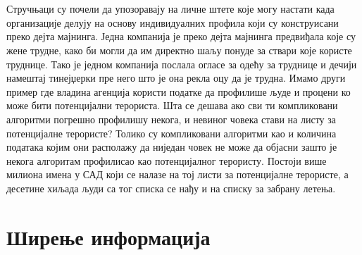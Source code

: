 \documentclass{article}
\begin{document}
\\\\
Стручњаци су почели да упозоравају на личне штете које могу настати када организације делују на основу индивидуалних профила који су конструисани преко дејта мајнинга. Једна компанија је преко дејта мајнинга предвиђала које су жене трудне, како би могли да им директно шаљу понуде за ствари које користе труднице. Тако је једном компанија послала огласе за одећу за труднице и дечији намештај тинејџерки пре него што је она рекла оцу да је трудна.
Имамо други пример где владина агенција користи податке да профилише људе и процени ко може бити потенцијални терориста. Шта се дешава ако сви ти компликовани алгоритми погрешно профилишу некога, и невиног човека стави на листу за потенцијалне терористе? Толико су компликовани алгоритми као и количина података којим они располажу да ниједан човек не може да објасни зашто је некога алгоритам профилисао као потенцијалног терористу. Постоји више милиона имена у САД који се налазе на тој листи за потенцијалне терористе, а десетине хиљада људи са тог списка се нађу и на списку за забрану летења.

\newpage
\section{Ширење информација}
\end{document}
